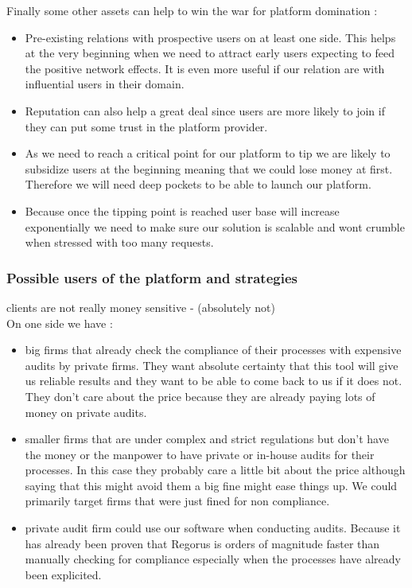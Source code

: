 \documentclass[10pt]{report}
\begin{document}
Finally some other assets can help to win the war for platform domination \autocite{eisenmann2006strategies} :
\begin{itemize}
\item Pre-existing relations with prospective users on at least one side. This helps at the very beginning when we need to attract early users expecting to feed the positive network effects. It is even more useful if our relation are with influential users in their domain.
\item Reputation can also help a great deal since users are more likely to join if they can put some trust in the platform provider.
\item As we need to reach a critical point for our platform to tip we are likely to subsidize users at the beginning meaning that we could lose money at first. Therefore we will need deep pockets to be able to launch our platform.
\item Because once the tipping point is reached user base will increase exponentially we need to make sure our solution is scalable and wont crumble when stressed with too many requests.
\end{itemize}

\subsubsection{Possible users of the platform and strategies}
clients are not really money sensitive - (absolutely not)\\
On one side we have :
\begin{itemize}
\item big firms that already check the compliance of their processes with expensive audits by private firms. They want absolute certainty that this tool will give us reliable results and they want to be able to come back to us if it does not. They don't care about the price because they are already paying lots of money on private audits.
\item smaller firms that are under complex and strict regulations but don't have the money or the manpower to have private or in-house audits for their processes. In this case they probably care a little bit about the price although saying that this might avoid them a big fine might ease things up. We could primarily target firms that were just fined for non compliance.
\item private audit firm could use our software when conducting audits. Because it has already been proven that Regorus is orders of magnitude faster than manually checking for compliance especially when the processes have already been explicited.
\end{itemize}
\end{document}
